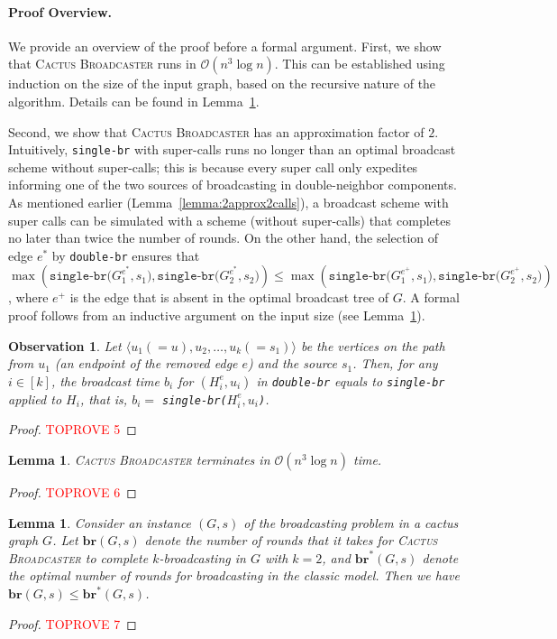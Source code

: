 \documentclass[letterpaper,11pt]{article}
\newtheorem{observation}{Observation}[section]
\newtheorem{lemma}[theorem]{Lemma}
\newcommand{\fast}{\textit{$k$-broadcasting}\xspace}
\newcommand{\br}{\boldsymbol{br}}
\newcommand{\bropt}{{\boldsymbol{br}^*}}
\newcommand{\oh}{\mathcal{O}}
\newcommand{\singlefunc}[1]{\texttt{single-br(#1)}\xspace}
\newcommand{\singlefuncc}{\texttt{single-br}\xspace}
\newcommand{\doublefuncc}{\texttt{double-br}\xspace}
\newcommand{\ouralgo}{\textsc{Cactus Broadcaster}\xspace}
\begin{document}
\paragraph{Proof Overview.}
We provide an overview of the proof before a formal argument.
First, we show that \ouralgo runs in $\oh(n^3 \log n)$. This can be established using induction on the size of the input graph, based on the recursive nature of the algorithm. Details can be found in Lemma~\ref{lemma:2approxpoly}.

Second, we show that \ouralgo has an approximation factor of $2$. Intuitively, \singlefuncc with super-calls runs no longer than an optimal broadcast scheme without super-calls; this is because every super call only expedites informing one of the two sources of broadcasting in double-neighbor components. As mentioned earlier (Lemma~\ref{lemma:2approx2calls}), a broadcast scheme with super calls can be simulated with a scheme (without super-calls) that completes no later than twice the number of rounds. 
On the other hand, the selection of edge $e^*$ by \doublefuncc ensures that 
$
    \max (\singlefunc{$G^{e^*}_1, s_1$}, \singlefunc{$G^{e^*}_2, s_2$}) \leq \max (\singlefunc{$G^{e^+}_1, s_1$}, \singlefunc{$G^{e^+}_2, s_2$})
$, 
where $e^+$ is the edge that is absent in the optimal broadcast tree of $G$. 
A formal proof follows from an inductive argument on the input size (see Lemma~\ref{lemma:2approxOPT}).

\begin{observation}\label{obs:doublefunc}
Let $\langle u_1 (=u), u_2,\ldots, u_k (=s_1) \rangle$ be the vertices on the path from $u_1$ (an endpoint of the removed edge $e$) and the source $s_1$. Then, for any $i\in [k]$, the broadcast time $b_i$ for $(H^e_i,u_i)$ in \doublefuncc equals to \singlefuncc applied to $H_i$, that is, $b_i = $ \singlefunc{$H^e_i, u_i$}.
\end{observation}
\begin{proof}\textcolor{red}{TOPROVE 5}\end{proof}


\begin{lemma} \label{lemma:2approxpoly}
\ouralgo terminates in $\oh(n^3 \log n)$ time.
\end{lemma}
\begin{proof}\textcolor{red}{TOPROVE 6}\end{proof}

\begin{lemma} \label{lemma:2approxOPT}
Consider an instance  $(G,s)$ of the broadcasting problem in a cactus graph $G$. Let $\br(G, s)$ denote the number of rounds that it takes for \ouralgo to complete \fast in $G$ with $k=2$, and $\bropt(G, s)$ denote the optimal number of rounds for broadcasting in the classic model. Then we have $\br(G, s)\leq \bropt(G, s)$.
\end{lemma}
\begin{proof}\textcolor{red}{TOPROVE 7}\end{proof}
\end{document}
